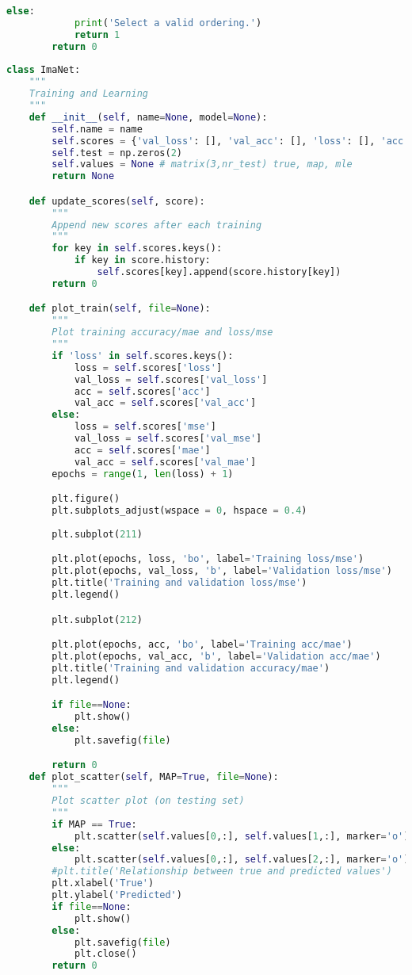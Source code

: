 \begin{lstlisting}[language=Python, breaklines]
        else:
            print('Select a valid ordering.')
            return 1
        return 0
        
class ImaNet:
    """
    Training and Learning
    """
    def __init__(self, name=None, model=None):
        self.name = name
        self.scores = {'val_loss': [], 'val_acc': [], 'loss': [], 'acc': [], 'val_mse': [], 'val_mae': [], 'mse': [], 'mae': []}
        self.test = np.zeros(2)
        self.values = None # matrix(3,nr_test) true, map, mle
        return None

    def update_scores(self, score):
        """
        Append new scores after each training
        """
        for key in self.scores.keys():
            if key in score.history:
                self.scores[key].append(score.history[key])
        return 0

    def plot_train(self, file=None):
        """
        Plot training accuracy/mae and loss/mse
        """
        if 'loss' in self.scores.keys():
            loss = self.scores['loss']
            val_loss = self.scores['val_loss']
            acc = self.scores['acc']
            val_acc = self.scores['val_acc']
        else:
            loss = self.scores['mse']
            val_loss = self.scores['val_mse']
            acc = self.scores['mae']
            val_acc = self.scores['val_mae']
        epochs = range(1, len(loss) + 1)

        plt.figure()
        plt.subplots_adjust(wspace = 0, hspace = 0.4)
        
        plt.subplot(211)

        plt.plot(epochs, loss, 'bo', label='Training loss/mse')
        plt.plot(epochs, val_loss, 'b', label='Validation loss/mse')
        plt.title('Training and validation loss/mse')
        plt.legend()

        plt.subplot(212)

        plt.plot(epochs, acc, 'bo', label='Training acc/mae')
        plt.plot(epochs, val_acc, 'b', label='Validation acc/mae')
        plt.title('Training and validation accuracy/mae')
        plt.legend()

        if file==None:
            plt.show()
        else:
            plt.savefig(file)

        return 0
    def plot_scatter(self, MAP=True, file=None):
        """
        Plot scatter plot (on testing set)
        """
        if MAP == True:
            plt.scatter(self.values[0,:], self.values[1,:], marker='o')
        else:
            plt.scatter(self.values[0,:], self.values[2,:], marker='o')
        #plt.title('Relationship between true and predicted values')
        plt.xlabel('True')
        plt.ylabel('Predicted')
        if file==None:
            plt.show()
        else:
            plt.savefig(file)
            plt.close()
        return 0


\end{lstlisting}
